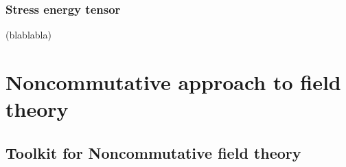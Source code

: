 \documentclass[10pt]{book}
\theoremstyle{break}
\begin{document}
\section{Stress energy tensor}


(blablabla)


\part{Noncommutative approach to field theory}


\chapter{Toolkit for Noncommutative field theory}
\end{document}
